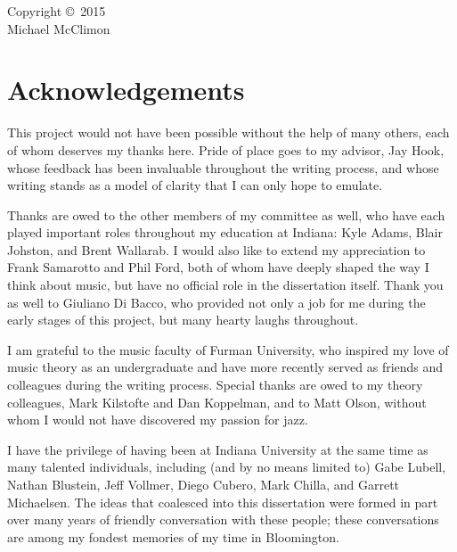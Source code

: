 {
}

\cleardoublepage

\begin{center}
  \vspace*{\fill}
  Copyright \copyright\ 2015 \\
  Michael McClimon
  \vspace*{\fill}
\end{center}
\cleardoublepage


\section*{\Large Acknowledgements}

\doublespacing

This project would not have been possible without the help of many others,
each of whom deserves my thanks here. Pride of place goes to my advisor, Jay
Hook, whose feedback has been invaluable throughout the writing process, and
whose writing stands as a model of clarity that I can only hope to emulate.

Thanks are owed to the other members of my committee as well, who have each
played important roles throughout my education at Indiana: Kyle Adams,
Blair Johston, and Brent Wallarab. I would also like to extend my
appreciation to Frank Samarotto and Phil Ford, both of whom have deeply shaped
the way I think about music, but have no official role in the dissertation
itself. Thank you as well to Giuliano Di Bacco, who provided not only a job
for me during the early stages of this project, but many hearty laughs throughout.

I am grateful to the music faculty of Furman University, who inspired my love
of music theory as an undergraduate and have more recently served as friends
and colleagues during the writing process. Special thanks are owed to my
theory colleagues, Mark Kilstofte and Dan Koppelman, and to Matt Olson,
without whom I would not have discovered my passion for jazz.

I have the privilege of having been at Indiana University at the same time as
many talented individuals, including (and by no means limited to) Gabe Lubell,
Nathan Blustein, Jeff Vollmer, Diego Cubero, Mark Chilla, and Garrett
Michaelsen. The ideas that coalesced into this dissertation were formed in
part over many years of friendly conversation with these people; these
conversations are among my fondest memories of my time in Bloomington.

